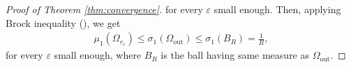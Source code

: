 \documentclass[12pt,reqno]{amsart}
\numberwithin{equation}{section}
\numberwithin{theorem}{section}
\numberwithin{equation}{section}
\numberwithin{theorem}{section}
\begin{document}
\begin{proof}[Proof of Theorem \ref{thm:convergence}]

\noindent for every $\varepsilon$ small enough. Then, applying Brock inequality (\cite{Bro2001}), we get 
    \begin{align*}
        \mu_1(\Omega_{r_{\varepsilon}})\leq \sigma_1(\Omega_\mathrm{out})\leq \sigma_1(B_R)= \frac{1}{R},
    \end{align*}
    for every $\varepsilon$ small enough, where $B_R$ is the ball having same measure as $\Omega_{\mathrm{out}}.$
     

\end{proof}
\end{document}
